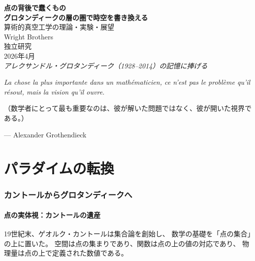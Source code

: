 \documentclass[11pt,a4paper]{article}
\begin{document}
\begin{center}
\vspace*{1cm}
{\Huge\bfseries 点の背後で蠢くもの}\\[0.8cm]
{\Large\bfseries グロタンディークの層の圏で時空を書き換える}\\[0.5cm]
{\large 算術的真空工学の理論・実験・展望}\\[2cm]
{\large Wright Brothers}\\[0.5cm]
{\normalsize 独立研究}\\[0.5cm]
{2026年4月}\\[3cm]
{\itshape アレクサンドル・グロタンディーク（1928--2014）の記憶に捧げる}
\vspace*{1cm}
\end{center}

\newpage
\tableofcontents
\newpage


\begin{epigraph}
\textit{La chose la plus importante dans un mathématicien, ce n'est pas le problème
qu'il résout, mais la vision qu'il ouvre.}

（数学者にとって最も重要なのは、彼が解いた問題ではなく、彼が開いた視界である。）

\hfill --- Alexander Grothendieck
\end{epigraph}

\vspace{1cm}

\part{パラダイムの転換}

\section{カントールからグロタンディークへ}

\subsection{点の実体視：カントールの遺産}

19世紀末、ゲオルク・カントールは集合論を創始し、
数学の基礎を「点の集合」の上に置いた。
空間は点の集まりであり、関数は点の上の値の対応であり、
物理量は点の上で定義された数値である。
\end{document}
